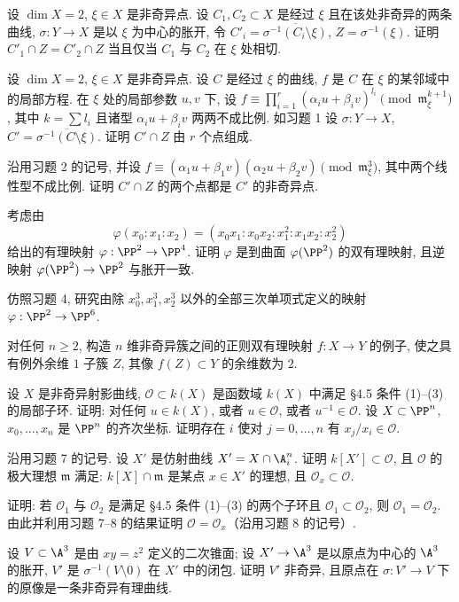 \begin{compactenum}
	\item 设 $\dim X = 2$, $\xi \in X$ 是非奇异点. 设 $C_1, C_2 \subset X$ 是经过 $\xi$ 且在该处非奇异的两条曲线, $\sigma: Y \to X$ 是以 $\xi$ 为中心的胀开, 令 $C'_i = \overline{\sigma^{-1}(C_i \setminus \xi)}$, $Z = \sigma^{-1}(\xi)$. 证明 $C'_1 \cap Z = C'_2 \cap Z$ 当且仅当 $C_1$ 与 $C_2$ 在 $\xi$ 处相切.
	\item 设 $\dim X = 2$, $\xi \in X$ 是非奇异点. 设 $C$ 是经过 $\xi$ 的曲线, $f$ 是 $C$ 在 $\xi$ 的某邻域中的局部方程. 在 $\xi$ 处的局部参数 $u, v$ 下, 设 $f \equiv \prod_{i=1}^{r} (\alpha_i u + \beta_i v)^{l_i} \pmod{\mathfrak m_\xi^{k+1}}$, 其中 $k = \sum l_i$ 且诸型 $\alpha_i u + \beta_i v$ 两两不成比例. 如习题 1 设 $\sigma: Y \to X$, $C' = \overline{\sigma^{-1}(C \setminus \xi)}$. 证明 $C' \cap Z$ 由 $r$ 个点组成.
	\item 沿用习题 2 的记号, 并设 $f \equiv (\alpha_1 u + \beta_1 v)(\alpha_2 u + \beta_2 v) \pmod{\mathfrak m_\xi^3}$, 其中两个线性型不成比例. 证明 $C' \cap Z$ 的两个点都是 $C'$ 的非奇异点.
	\item 考虑由
	\[
		\varphi(x_0 : x_1 : x_2) = (x_0 x_1 : x_0 x_2 : x_1^2 : x_1 x_2 : x_2^2)
	\]
	给出的有理映射 $\varphi: \PP^2 \to \PP^4$. 证明 $\varphi$ 是到曲面 $\varphi(\PP^2)$ 的双有理映射, 且逆映射 $\varphi(\PP^2) \to \PP^2$ 与胀开一致.
	\item 仿照习题 4, 研究由除 $x_0^3, x_1^3, x_2^3$ 以外的全部三次单项式定义的映射 $\varphi: \PP^2 \to \PP^6$.
	\item 对任何 $n \ge 2$, 构造 $n$ 维非奇异簇之间的正则双有理映射 $f: X \to Y$ 的例子, 使之具有例外余维 $1$ 子簇 $Z$, 其像 $f(Z) \subset Y$ 的余维数为 $2$.
	\item 设 $X$ 是非奇异射影曲线, $\mathcal O \subset k(X)$ 是函数域 $k(X)$ 中满足 §4.5 条件 (1)--(3) 的局部子环. 证明: 对任何 $u \in k(X)$, 或者 $u \in \mathcal O$, 或者 $u^{-1} \in \mathcal O$. 设 $X \subset \PP^n$, $x_0, \ldots, x_n$ 是 $\PP^n$ 的齐次坐标. 证明存在 $i$ 使对 $j = 0, \ldots, n$ 有 $x_j/x_i \in \mathcal O$.
	\item 沿用习题 7 的记号. 设 $X'$ 是仿射曲线 $X' = X \cap \A^n_i$. 证明 $k[X'] \subset \mathcal O$, 且 $\mathcal O$ 的极大理想 $\mathfrak m$ 满足: $k[X] \cap \mathfrak m$ 是某点 $x \in X'$ 的理想, 且 $\mathcal O_x \subset \mathcal O$.
	\item 证明: 若 $\mathcal O_1$ 与 $\mathcal O_2$ 是满足 §4.5 条件 (1)--(3) 的两个子环且 $\mathcal O_1 \subset \mathcal O_2$, 则 $\mathcal O_1 = \mathcal O_2$. 由此并利用习题 7--8 的结果证明 $\mathcal O = \mathcal O_x$（沿用习题 8 的记号）.
	\item 设 $V \subset \A^3$ 是由 $xy = z^2$ 定义的二次锥面; 设 $X' \to \A^3$ 是以原点为中心的 $\A^3$ 的胀开, $V'$ 是 $\sigma^{-1}(V \setminus 0)$ 在 $X'$ 中的闭包. 证明 $V'$ 非奇异, 且原点在 $\sigma: V' \to V$ 下的原像是一条非奇异有理曲线.
\end{compactenum}
